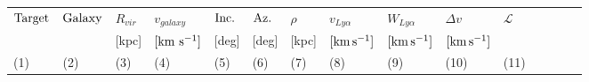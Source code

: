\documentclass[twocolumn,tighten]{aastex6}
\begin{document}
\begin{table}[ht]\footnotesize
\begin{center}
\begin{tabular}{l l l l l l l l l l l l l l l}
 \hline \hline
  $\rm Target$	&  $\rm Galaxy$  & $R_{vir}$        & $v_{galaxy}$ 	   	  &  $\rm Inc.$               &  $\rm Az.$ 	       & $\rho$		   & $v_{Ly\alpha}$	 	  	& $W_{Ly\alpha}$  & $\Delta v$  			 & $\mathcal{L}$ \\ 
  	  &       & \scriptsize [kpc] & \scriptsize  $\rm [km ~s^{-1}]$ & \scriptsize [deg] & \scriptsize [deg] & \scriptsize [kpc] & \scriptsize  $\rm [km\, s^{-1}]$ & \scriptsize $\rm [km\, s^{-1}]$ & \scriptsize  $\rm [km\, s^{-1}]$ &  \\
 \scriptsize (1) & \scriptsize (2) & \scriptsize (3)    & \scriptsize (4)     & \scriptsize (5)    & \scriptsize (6)   & \scriptsize  (7)   & \scriptsize (8) & \scriptsize (9) & \scriptsize (10) & \scriptsize (11) \\ \hline \hline


\end{tabular}
\end{center}
\end{table}
\end{document}
